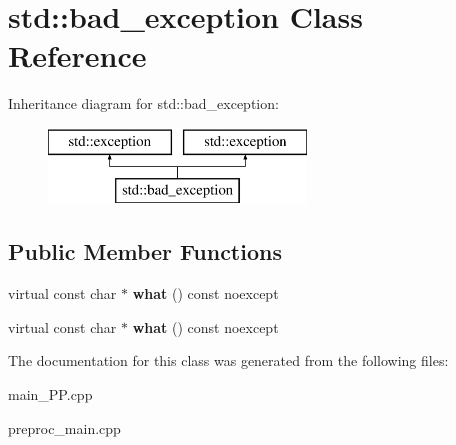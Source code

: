 \hypertarget{classstd_1_1bad__exception}{\section{std\+:\+:bad\+\_\+exception Class Reference}
\label{classstd_1_1bad__exception}
}
Inheritance diagram for std\+:\+:bad\+\_\+exception\+:\begin{figure}[H]
\begin{center}
\leavevmode
\includegraphics[height=2.000000cm]{classstd_1_1bad__exception}
\end{center}
\end{figure}
\subsection*{Public Member Functions}
\begin{DoxyCompactItemize}
\item 
\hypertarget{classstd_1_1bad__exception_a01e2c7a741b840a9ea27789d50e9d65c}{virtual const char $\ast$ {\bfseries what} () const noexcept}\label{classstd_1_1bad__exception_a01e2c7a741b840a9ea27789d50e9d65c}

\item 
\hypertarget{classstd_1_1bad__exception_a01e2c7a741b840a9ea27789d50e9d65c}{virtual const char $\ast$ {\bfseries what} () const noexcept}\label{classstd_1_1bad__exception_a01e2c7a741b840a9ea27789d50e9d65c}

\end{DoxyCompactItemize}


The documentation for this class was generated from the following files\+:\begin{DoxyCompactItemize}
\item 
main\+\_\+\+P\+P.\+cpp\item 
preproc\+\_\+main.\+cpp\end{DoxyCompactItemize}
